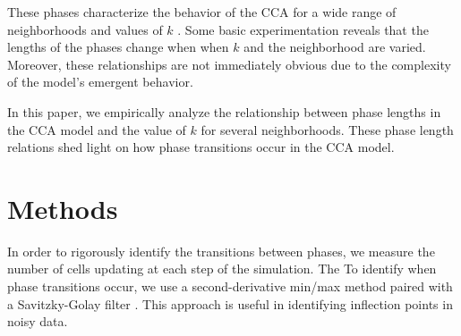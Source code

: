 \documentclass[%
 amsmath,amssymb,
 aps,
]{revtex4-1}
\begin{document}
These phases characterize the behavior of the CCA for a wide range of neighborhoods and values of $k$ \cite{Fisch1991Thresh}. Some basic experimentation reveals that the lengths of the phases change when when $k$ and the neighborhood are varied. Moreover, these relationships are not immediately obvious due to the complexity of the model's emergent behavior.

In this paper, we empirically analyze the relationship between phase lengths in the CCA model and the value of $k$ for several neighborhoods. These phase length relations shed light on how phase transitions occur in the CCA model. 

\section{Methods} 
In order to rigorously identify the transitions between phases, we measure the number of cells updating at each step of the simulation. The 
To identify when phase transitions occur, we use a second-derivative min/max method paired with a Savitzky-Golay filter \cite{SavitzkyGolay}. This approach is useful in identifying inflection points in noisy data.




\end{document}

